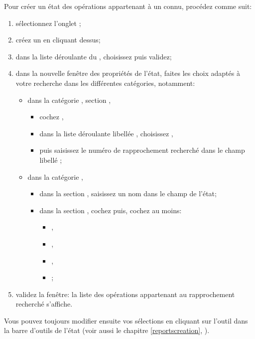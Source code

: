 Pour créer un état des opérations appartenant à un  connu, procédez comme suit:
\begin{enumerate}
	\item sélectionnez l'onglet ;
	\item créez un  en cliquant dessus;
	\item dans la liste déroulante du , choisissez  puis validez; 
	\item dans la nouvelle fenêtre des propriétés de l'état, faites les choix adaptés à votre recherche dans les différentes catégories, notamment:
	\begin{itemize}
		\item dans la catégorie , section ,
		\begin{itemize}
				\item cochez ,
				\item dans la liste déroulante libellée , choisissez ,
				\item puis saisissez le numéro de rapprochement recherché dans le champ libellé ;
		\end{itemize}
		\item dans la catégorie ,
		\begin{itemize}
			\item dans la section , saisissez un nom dans le champ  de l'état;
			\item dans la section , cochez  puis, cochez au moins:
			\begin{itemize}
				\item {},
				\item {},
				\item {},
				\item {};
			\end{itemize}
		\end{itemize}	
	\end{itemize}
	\item validez la fenêtre: la liste des opérations appartenant au rapprochement recherché s'affiche.
\end{enumerate}

Vous pouvez toujours modifier ensuite vos sélections en cliquant sur l'outil  dans la barre d'outils de l'état (voir aussi le chapitre \vref{reportscreation}, ).


